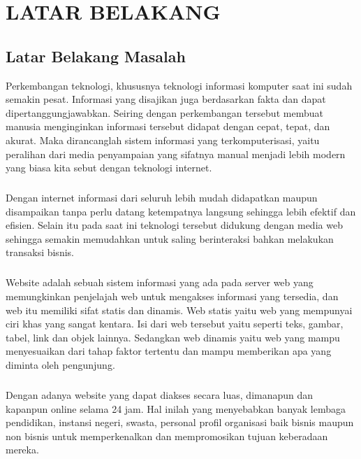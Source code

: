 \documentclass{jtetiproposalskripsi}
\begin{document}
\tableofcontents
{}
\clearpage{}\setcounter{page}{1}

\chapter{LATAR BELAKANG}

\section{Latar Belakang Masalah}
Perkembangan  teknologi, khususnya teknologi informasi komputer saat ini sudah semakin pesat. Informasi yang disajikan juga berdasarkan fakta dan dapat dipertanggungjawabkan. Seiring dengan  perkembangan tersebut membuat manusia menginginkan informasi tersebut didapat dengan cepat,  tepat, dan akurat. Maka dirancanglah sistem informasi yang terkomputerisasi, yaitu peralihan  dari  media penyampaian yang sifatnya manual menjadi lebih modern yang biasa kita sebut dengan teknologi internet. 
\paragraph{}
Dengan internet informasi dari seluruh lebih mudah didapatkan maupun disampaikan tanpa perlu datang ketempatnya langsung sehingga lebih efektif dan efisien. Selain itu pada saat ini teknologi tersebut didukung dengan media web sehingga  semakin memudahkan untuk saling berinteraksi bahkan melakukan transaksi bisnis. 
\paragraph{}
Website adalah sebuah sistem informasi yang ada pada server web yang memungkinkan penjelajah web untuk  mengakses informasi yang tersedia, dan web itu memiliki sifat statis dan dinamis. Web statis yaitu web yang  mempunyai ciri khas yang sangat  kentara. Isi dari web tersebut yaitu seperti teks,  gambar, tabel, link dan objek lainnya. Sedangkan web dinamis yaitu web yang mampu menyesuaikan dari tahap faktor tertentu dan mampu memberikan apa yang diminta oleh pengunjung.
\paragraph{}
Dengan adanya website yang dapat diakses secara luas, dimanapun dan kapanpun online selama 24 jam. Hal inilah yang menyebabkan banyak lembaga pendidikan, instansi negeri, swasta, personal profil organisasi baik bisnis maupun non bisnis untuk memperkenalkan dan mempromosikan tujuan keberadaan mereka.
\end{document}
